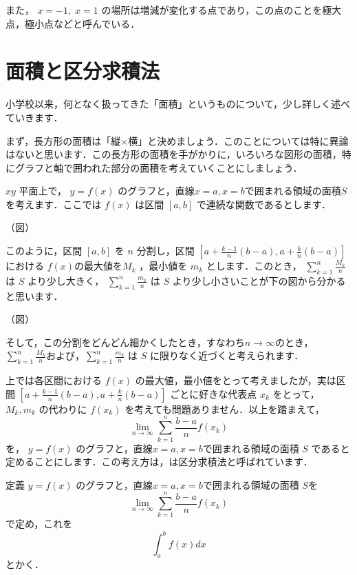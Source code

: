 \documentclass[
  b4paperpaper,
  xelatex,ja=standard]{bxjsbook}
\begin{document}
また， \(x=-1,\; x=1\)
の場所は増減が変化する点であり，この点のことを極大点，極小点などと呼んでいる．

\hypertarget{ux9762ux7a4dux3068ux533aux5206ux6c42ux7a4dux6cd5}{%
\section{面積と区分求積法}\label{ux9762ux7a4dux3068ux533aux5206ux6c42ux7a4dux6cd5}}

小学校以来，何となく扱ってきた「面積」というものについて，少し詳しく述べていきます．

まず，長方形の面積は「縦\(\times\)横」と決めましょう．このことについては特に異論はないと思います．この長方形の面積を手がかりに，いろいろな図形の面積，特にグラフと軸で囲われた部分の面積を考えていくことにしましょう．

\(xy\) 平面上で， \(y=f(x)\)
のグラフと，直線\(x=a,x=b\)で囲まれる領域の面積\(S\)を考えます．ここでは
\(f(x)\) は区間 \([a,b]\) で連続な関数であるとします．

（図）

このように，区間 \([a,b]\) を \(n\) 分割し，区間
\(\left[a+\displaystyle\frac{k-1}{n}(b-a),a+\displaystyle\frac{k}{n}(b-a)\right]\)
における \(f(x)\)の最大値を\(M_k\) ，最小値を \(m_k\)
とします．このとき，
\(\displaystyle\sum_{k=1}^{n}\displaystyle\frac{M_k}{n}\) は \(S\)
より少し大きく，
\(\displaystyle\sum_{k=1}^{n}\displaystyle\frac{m_k}{n}\) は \(S\)
より少し小さいことが下の図から分かると思います．

（図）

そして，この分割をどんどん細かくしたとき，すなわち\(n\to\infty\)のとき，\(\displaystyle\sum_{k=1}^{n}\displaystyle\frac{M_k}{n}\)および，\(\displaystyle\sum_{k=1}^{n}\displaystyle\frac{m_k}{n}\)
は \(S\) に限りなく近づくと考えられます．

上では各区間における \(f(x)\)
の最大値，最小値をとって考えましたが，実は区間
\(\left[a+\displaystyle\frac{k-1}{n}(b-a),a+\displaystyle\frac{k}{n}(b-a)\right]\)
ごとに好きな代表点 \(x_k\) をとって， \(M_k,m_k\) の代わりに \(f(x_k)\)
を考えても問題ありません．以上を踏まえて，
\[\displaystyle\lim_{n\to\infty} \displaystyle\sum_{k=1}^{n}\displaystyle\frac{b-a}{n}f(x_k)\]
を， \(y=f(x)\) のグラフと，直線\(x=a,x=b\)で囲まれる領域の面積 \(S\)
であると定めることにします．この考え方は，は区分求積法と呼ばれています．

\begin{Dbox}{定義}
\(y=f(x)\) のグラフと，直線\(x=a,x=b\)で囲まれる領域の面積 \(S\)を
\[\displaystyle\lim_{n\to\infty} \displaystyle\sum_{k=1}^{n}\displaystyle\frac{b-a}{n}f(x_k)\]
で定め，これを \[\displaystyle\int_{a}^{b}f(x)dx\] とかく．

\end{Dbox}
\end{document}
